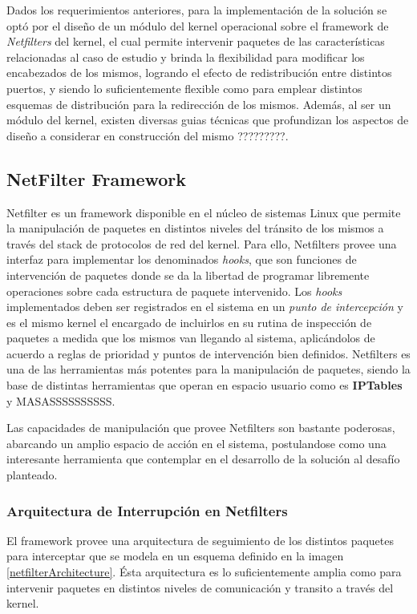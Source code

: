 Dados los requerimientos anteriores, para la implementación de la solución se optó por el diseño de un módulo del kernel operacional sobre el framework de \emph{Netfilters} del kernel, el cual permite intervenir paquetes de las características relacionadas al caso de estudio y brinda la flexibilidad para modificar los encabezados de los mismos, logrando el efecto de redistribución entre distintos puertos, y siendo lo suficientemente flexible como para emplear distintos esquemas de distribución para la redirección de los mismos. Además, al ser un módulo del kernel, existen diversas guias técnicas que profundizan los aspectos de diseño a considerar en construcción del mismo ?????????.

\subsection{NetFilter Framework}
Netfilter \cite{report:netfilterModule} es un framework disponible en el núcleo de sistemas Linux que permite la manipulación de paquetes en distintos niveles del tránsito de los mismos a través del stack de protocolos de red del kernel. Para ello, Netfilters provee una interfaz para implementar los denominados \emph{hooks}, que son funciones de intervención de paquetes donde se da la libertad de programar libremente operaciones sobre cada estructura de paquete intervenido. Los \emph{hooks} implementados deben ser registrados en el sistema en un \emph{punto de intercepción} y es el mismo kernel el encargado de incluirlos en su rutina de inspección de paquetes a medida que los mismos van llegando al sistema, aplicándolos de acuerdo a reglas de prioridad y puntos de intervención bien definidos. Netfilters es una de las herramientas más potentes para la manipulación de paquetes, siendo la base de distintas herramientas que operan en espacio usuario como es \textbf{IPTables} y MASASSSSSSSSSS.

Las capacidades de manipulación que provee Netfilters son bastante poderosas, abarcando un amplio espacio de acción en el sistema, postulandose como una interesante herramienta que contemplar en el desarrollo de la solución al desafío planteado.

\subsubsection{Arquitectura de Interrupción en Netfilters}
El framework provee una arquitectura de seguimiento de los distintos paquetes para interceptar que se modela en un esquema definido en la imagen \ref{netfilterArchitecture}. Ésta arquitectura es lo suficientemente amplia como para intervenir paquetes en distintos niveles de comunicación y transito a través del kernel.

